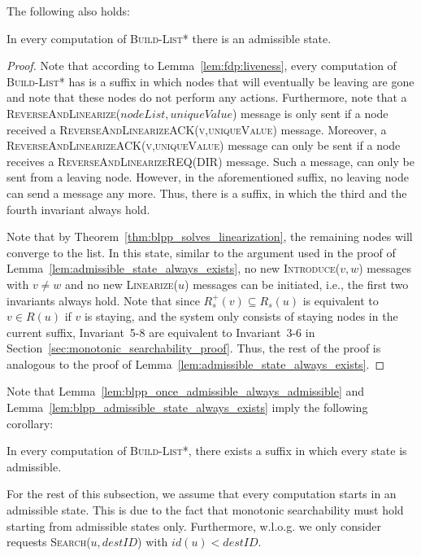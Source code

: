 \documentclass[a4paper,USenglish]{lipics}
\newcommand{\blpp}{\textsc{Build-List*}\xspace}
\newcommand{\linearize}[1]{\textsc{Linearize(\ensuremath{#1})}\xspace}
\newcommand{\introduce}[1]{\textsc{Introduce(\ensuremath{#1})}\xspace}
\newcommand{\search}[1]{\textsc{Search(\ensuremath{#1})}\xspace}
\newcommand{\rsp}{\ensuremath{R_s^+}\xspace}
\newcommand{\revandlin}[1]{\textsc{ReverseAndLinearize(\ensuremath{#1})}\xspace} \newcommand{\revandlinREQ}[1]{\textsc{ReverseAndLinearizeREQ(#1)}\xspace}
\newcommand{\revandlinACK}[1]{\textsc{ReverseAndLinearizeACK(#1)}\xspace}
\begin{document}
The following also holds:
\begin{lemma}\label{lem:blpp_admissible_state_always_exists}
 In every computation of \blpp there is an admissible state.
\end{lemma}
\begin{proof}
 Note that according to Lemma~\ref{lem:fdp:liveness}, every computation of \blpp has is a suffix in which nodes that will eventually be leaving are gone and note that these nodes do not perform any actions.
 Furthermore, note that a \revandlin{nodeList,uniqueValue} message is only sent if a node received a \revandlinACK{v,uniqueValue} message.
 Moreover, a \revandlinACK{v,uniqueValue} message can only be sent if a node receives a \revandlinREQ{DIR} message.
 Such a message, can only be sent from a leaving node.
 However, in the aforementioned suffix, no leaving node can send a message any more. 
 Thus, there is a suffix, in which the third and the fourth invariant always hold.
 
 Note that by Theorem~\ref{thm:blpp_solves_linearization}, the remaining nodes will converge to the list.
 In this state, similar to the argument used in the proof of Lemma~\ref{lem:admissible_state_always_exists}, no new \introduce{v,w} messages with $v \neq w$ and no new \linearize{u} messages can be initiated, i.e., the first two invariants always hold.
 Note that since $\rsp(v) \subseteq R_s(u)$ is equivalent to $v \in R(u)$ if $v$ is staying, and the system only consists of staying nodes in the current suffix, Invariant~5-8 are equivalent to Invariant~3-6 in Section~\ref{sec:monotonic_searchability_proof}.
 Thus, the rest of the proof is analogous to the proof of Lemma~\ref{lem:admissible_state_always_exists}.
\end{proof}
Note that Lemma~\ref{lem:blpp_once_admissible_always_admissible} and Lemma~\ref{lem:blpp_admissible_state_always_exists} imply the following corollary:
\begin{corollary}
    In every computation of \blpp, there exists a suffix in which every state is admissible. 
\end{corollary}
For the rest of this subsection, we assume that every computation starts in an admissible state.
This is due to the fact that monotonic searchability must hold starting from admissible states only.
Furthermore, w.l.o.g. we only consider requests \search{u,destID} with $id(u) < destID$.
\end{document}
